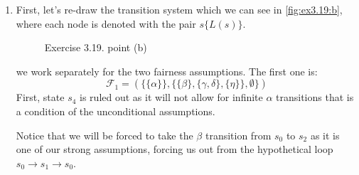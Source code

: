\documentclass{article}
\begin{document}
\begin{enumerate}[label=(\alph*)]
\begin{enumerate}[label=(\roman*)]
\begin{enumerate}[label=\arabic*.]
\begin{enumerate}[label=\roman*.]
				\end{enumerate}
			\end{enumerate}
		\end{enumerate}
		\item First, let's re-draw the transition system which we can see in \autoref{fig:ex3.19:b}, where each node is denoted with the pair $s \{L(s)\}$.
		\begin{figure}[ht]
			\centering
			\caption{Exercise 3.19. point (b)}
			\label{fig:ex3.19:b}
		\end{figure}
		 we work separately for the two fairness assumptions.
		The first one is:
		$$
		\mathcal{F}_1=(\{\{\alpha\}\}, \{\{\beta \}, \{\gamma, \delta\}, \{\eta \}\}, \emptyset\})
		$$
		First, state $s_4$ is ruled out as it will not allow for infinite $\alpha$ transitions that is a condition of the unconditional assumptions.
		
		 Notice that we will be forced to take the $\beta$ transition from $s_0$ to $s_2$ as it is one of our strong assumptions, forcing us out from the hypothetical loop $s_0 \rightarrow s_1 \rightarrow s_0$.
		

\end{enumerate}
\end{document}

